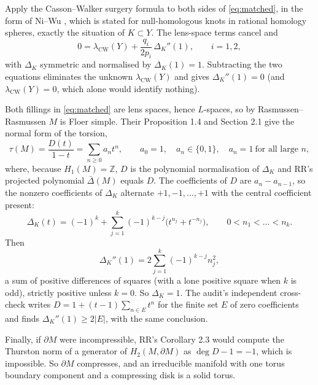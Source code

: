 \documentclass[11pt]{amsart}
\theoremstyle{remark}
\newcommand{\Z}{\mathbb{Z}}
\newcommand{\lCW}{\lambda_{\mathrm{CW}}}
\begin{document}
Apply the Casson--Walker surgery formula to both sides of \eqref{eq:matched}, in the form of Ni--Wu \cite[Prop.~3.1]{NiWu}, which is stated for null-homologous knots in rational homology spheres, exactly the situation of $K\subset Y$. The lens-space terms cancel and
\begin{equation}\label{eq:cw}
0=\lCW(Y)+\frac{q_i}{2p_i}\,\Delta_K''(1),\qquad i=1,2,
\end{equation}
with $\Delta_K$ symmetric and normalised by $\Delta_K(1)=1$. Subtracting the two equations eliminates the unknown $\lCW(Y)$ and gives $\Delta_K''(1)=0$ (and $\lCW(Y)=0$, which alone would identify nothing).

Both fillings in \eqref{eq:matched} are lens spaces, hence $L$-spaces, so by Rasmussen--Rasmussen \cite[Prop.~1.3]{RR} $M$ is Floer simple. Their Proposition 1.4 and Section 2.1 give the normal form of the torsion,
\[
\tau(M)=\frac{D(t)}{1-t}=\sum_{n\ge 0}a_nt^n,\qquad a_0=1,\quad a_n\in\{0,1\},\quad a_n=1\ \text{for all large }n,
\]
where, because $H_1(M)=\Z$, $D$ is the polynomial normalisation of $\Delta_K$ and RR's projected polynomial $\bar\Delta(M)$ equals $D$. The coefficients of $D$ are $a_n-a_{n-1}$, so the nonzero coefficients of $\Delta_K$ alternate $+1,-1,\dots,+1$ with the central coefficient present:
\begin{equation}\label{eq:alt}
\Delta_K(t)=(-1)^k+\sum_{j=1}^{k}(-1)^{k-j}\bigl(t^{n_j}+t^{-n_j}\bigr),\qquad 0<n_1<\dots<n_k .
\end{equation}
Then
\[
\Delta_K''(1)=2\sum_{j=1}^{k}(-1)^{k-j}n_j^2 ,
\]
a sum of positive differences of squares (with a lone positive square when $k$ is odd), strictly positive unless $k=0$. So $\Delta_K=1$. The audit's independent cross-check writes $D=1+(t-1)\sum_{n\in E}t^n$ for the finite set $E$ of zero coefficients and finds $\Delta_K''(1)\ge 2|E|$, with the same conclusion.

Finally, if $\partial M$ were incompressible, RR's Corollary 2.3 would compute the Thurston norm of a generator of $H_2(M,\partial M)$ as $\deg D-1=-1$, which is impossible. So $\partial M$ compresses, and an irreducible manifold with one torus boundary component and a compressing disk is a solid torus.
\end{document}
